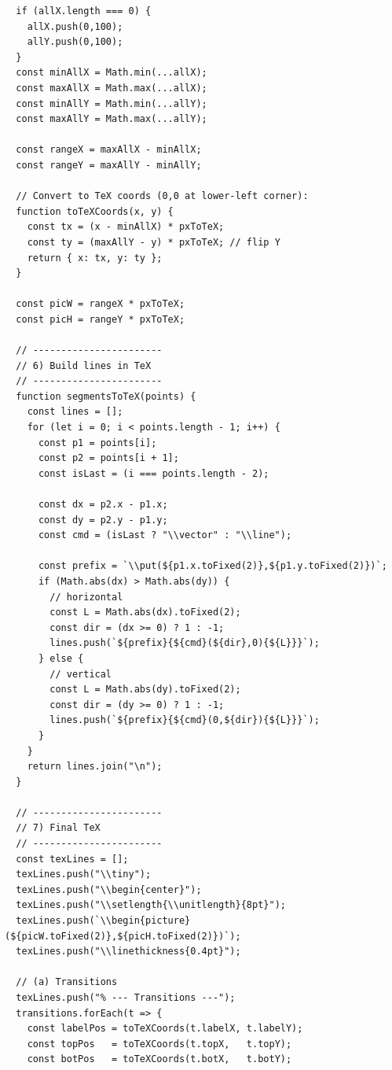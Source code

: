 \begin{verbatim}
  if (allX.length === 0) {
    allX.push(0,100);
    allY.push(0,100);
  }
  const minAllX = Math.min(...allX);
  const maxAllX = Math.max(...allX);
  const minAllY = Math.min(...allY);
  const maxAllY = Math.max(...allY);

  const rangeX = maxAllX - minAllX;
  const rangeY = maxAllY - minAllY;

  // Convert to TeX coords (0,0 at lower-left corner):
  function toTeXCoords(x, y) {
    const tx = (x - minAllX) * pxToTeX;
    const ty = (maxAllY - y) * pxToTeX; // flip Y
    return { x: tx, y: ty };
  }

  const picW = rangeX * pxToTeX;
  const picH = rangeY * pxToTeX;

  // -----------------------
  // 6) Build lines in TeX
  // -----------------------
  function segmentsToTeX(points) {
    const lines = [];
    for (let i = 0; i < points.length - 1; i++) {
      const p1 = points[i];
      const p2 = points[i + 1];
      const isLast = (i === points.length - 2);

      const dx = p2.x - p1.x;
      const dy = p2.y - p1.y;
      const cmd = (isLast ? "\\vector" : "\\line");

      const prefix = `\\put(${p1.x.toFixed(2)},${p1.y.toFixed(2)})`;
      if (Math.abs(dx) > Math.abs(dy)) {
        // horizontal
        const L = Math.abs(dx).toFixed(2);
        const dir = (dx >= 0) ? 1 : -1;
        lines.push(`${prefix}{${cmd}(${dir},0){${L}}}`);
      } else {
        // vertical
        const L = Math.abs(dy).toFixed(2);
        const dir = (dy >= 0) ? 1 : -1;
        lines.push(`${prefix}{${cmd}(0,${dir}){${L}}}`);
      }
    }
    return lines.join("\n");
  }

  // -----------------------
  // 7) Final TeX
  // -----------------------
  const texLines = [];
  texLines.push("\\tiny");
  texLines.push("\\begin{center}");
  texLines.push("\\setlength{\\unitlength}{8pt}");
  texLines.push(`\\begin{picture}(${picW.toFixed(2)},${picH.toFixed(2)})`);
  texLines.push("\\linethickness{0.4pt}");

  // (a) Transitions
  texLines.push("% --- Transitions ---");
  transitions.forEach(t => {
    const labelPos = toTeXCoords(t.labelX, t.labelY);
    const topPos   = toTeXCoords(t.topX,   t.topY);
    const botPos   = toTeXCoords(t.botX,   t.botY);


\end{verbatim}
